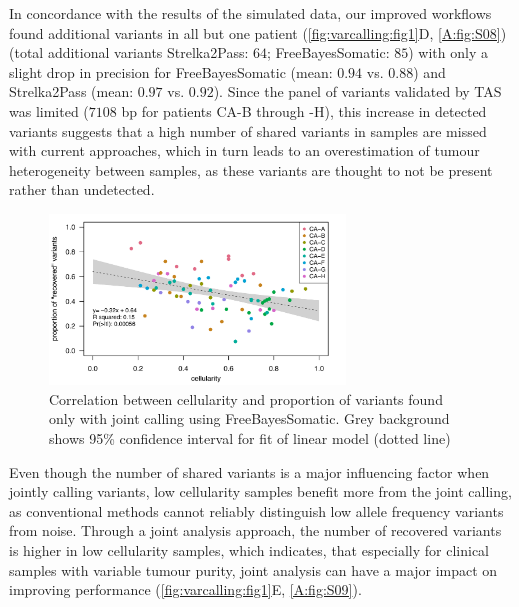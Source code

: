 In concordance with the results of the simulated data, our improved workflows found additional variants in all but one patient (\autoref{fig:varcalling:fig1}D, \autoref{A:fig:S08}) (total additional variants Strelka2Pass: $64$; FreeBayesSomatic: $85$) with only a slight drop in precision for FreeBayesSomatic (mean: $0.94$ vs. $0.88$) and Strelka2Pass (mean: $0.97$ vs. $0.92$). Since the panel of variants validated by TAS was limited ($7108$ bp for patients CA-B through -H), this increase in detected variants suggests that a high number of shared variants in samples are missed with current approaches, which in turn leads to an overestimation of tumour heterogeneity between samples, as these variants are thought to not be present rather than undetected.


\begin{figure}[htbp]
\centering
  \includegraphics[width=0.7\textwidth]{Appendices/Variantcalling/supp/S9}
  \caption[Correlation between cellularity and proportion of variants found only with joint calling using FreeBayesSomatic]{Correlation between cellularity and proportion of variants found only with joint calling using FreeBayesSomatic. Grey background shows 95\% confidence interval for fit of linear model (dotted line)}\label{A:fig:S09}
\end{figure}

Even though the number of shared variants is a major influencing factor when jointly calling variants, low cellularity samples benefit more from the joint calling, as conventional methods cannot reliably distinguish low allele frequency variants from noise. Through a joint analysis approach, the number of recovered variants is higher in low cellularity samples, which indicates, that especially for clinical samples with variable tumour purity, joint analysis can have a major impact on improving performance (\autoref{fig:varcalling:fig1}E, \autoref{A:fig:S09}).


